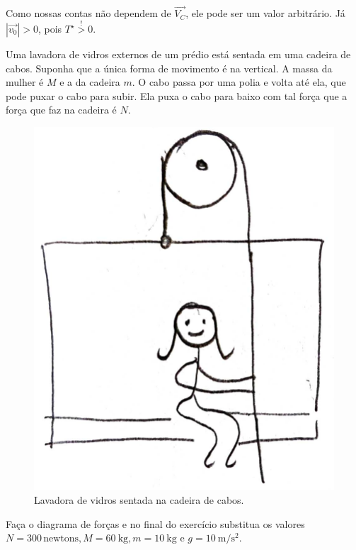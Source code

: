 \documentclass[]{IMTexam}
\begin{document}
\begin{questions}
\begin{solution}
		Como nossas contas não dependem de $\vec{V_C}$, ele pode ser um valor arbitrário. Já $ |\vec{v_0}|>0 $, pois $T^{\star}\stackrel{!}{>}0$.
	\end{solution}



	\question Uma lavadora de vidros externos de um prédio está sentada em uma cadeira de cabos. Suponha que a única forma de movimento é na vertical. A massa da mulher é $ M $ e a da cadeira $ m $. O cabo passa por uma polia e volta até ela, que pode puxar o cabo para subir. Ela puxa o cabo para baixo com tal força que a força que faz na cadeira é $ N $.

	\begin{figure}[H]
		\centering
		\includegraphics[width=0.4\linewidth]{screenshot002}
		\caption{Lavadora de vidros sentada na cadeira de cabos.}
		\label{fig:fig2}
	\end{figure}


	Faça o diagrama de forças e no final do exercício substitua os valores
	$ N = 300\,\text{newtons}, M = \SI{60}{\kilogram}, m = \SI{10}{\kilogram} $ e $ g = \SI{10}{\meter\per\second\squared}$.

	\clearpage

	\begin{solution}


\end{solution}
\end{questions}
\end{document}
